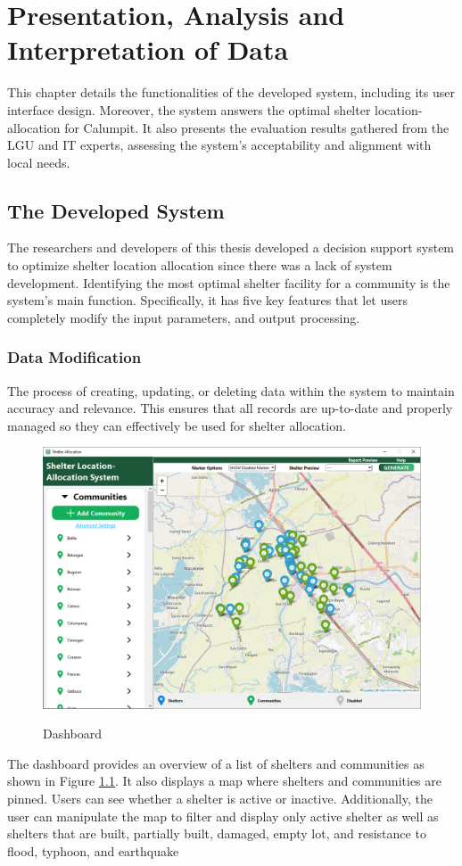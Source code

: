 \chapter{Presentation, Analysis and Interpretation of Data}
	This chapter details the functionalities of the developed system, including its user interface design. Moreover, the system answers the optimal shelter location-allocation for Calumpit. It also presents the evaluation results gathered from the LGU and IT experts, assessing the system’s acceptability and alignment with local needs.

\section{The Developed System}
	The researchers and developers of this thesis developed a decision support system to optimize shelter location allocation since there was a lack of system development. Identifying the most optimal shelter facility for a community is the system's main function. Specifically, it has five key features that let users completely modify the input parameters, and output processing. 


\subsection{Data Modification}
	The process of creating, updating, or deleting data within the system to maintain accuracy and relevance. This ensures that all records are up-to-date and properly managed so they can effectively be used for shelter allocation.
	
	\begin{figure}[h!]
		\caption{Dashboard}
		\centering
		\includegraphics[width=4.5in]{Chapter 4/dashboard}
		\label{db}
	\end{figure}
	The dashboard provides an overview of a list of shelters and communities as shown in Figure \ref{db}. It also displays a map where shelters and communities are pinned. Users can see whether a shelter is active or inactive. Additionally, the user can manipulate the map to filter and display only active shelter as well as shelters that are built, partially built, damaged, empty lot, and resistance to flood, typhoon, and earthquake
	
